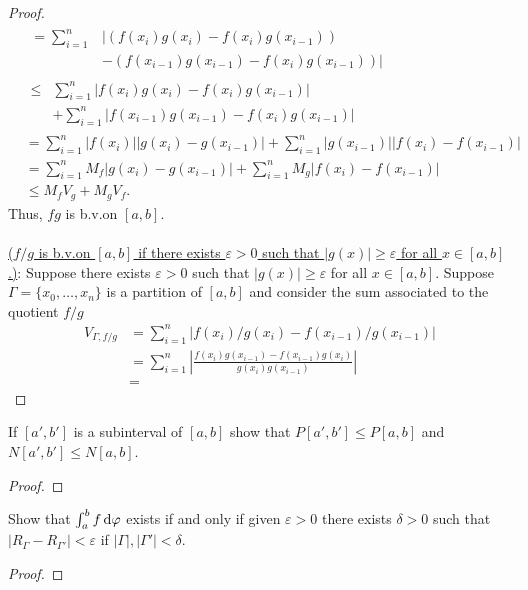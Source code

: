 \begin{proof}
\begin{equation}
\begin{aligned}
      &\begin{aligned}
        =\sum_{i=1}^n
        &\left|(f(x_i)g(x_i)-f(x_i)g(x_{i-1}))\right.\\
        &\left.-(f(x_{i-1})g(x_{i-1})-f(x_i)g(x_{i-1}))\right|
      \end{aligned}\\
      &\begin{aligned}
        \leq&\sum_{i=1}^n|f(x_i)g(x_i)-f(x_i)g(x_{i-1})|\\
        &+\sum_{i=1}^n|f(x_{i-1})g(x_{i-1})-f(x_i)g(x_{i-1})|
      \end{aligned}\\
      &=\sum_{i=1}^n|f(x_i)||g(x_i)-g(x_{i-1})|+\sum_{i=1}^n|g(x_{i-1})||f(x_i)-f(x_{i-1})|\\
      &=\sum_{i=1}^n
      M_f|g(x_i)-g(x_{i-1})|+\sum_{i=1}^nM_g|f(x_i)-f(x_{i-1})|\\
      &\leq M_fV_g+M_gV_f.
      \end{aligned}
    \end{equation}
    Thus, $fg$ is b.v.\@ on $[a,b]$.
    \\\\
    \underline{($f/g$ is b.v.\@ on $[a,b]$ if there exists $\varepsilon>0$
      such that $|g(x)|\geq\varepsilon$ for all $x\in[a,b]$.)}: Suppose
    there exists $\varepsilon>0$ such that $|g(x)|\geq\varepsilon$ for all
    $x\in[a,b]$. Suppose $\Gamma=\{x_0,\dotsc,x_n\}$ is a partition of
    $[a,b]$ and consider the sum associated to the quotient $f/g$
    \begin{equation}
      \label{eq:1:7}
      \begin{aligned}
        V_{\Gamma,f/g}
        &=\sum_{i=1}^n |f(x_i)/g(x_i)-f(x_{i-1})/g(x_{i-1})|\\
        &=\sum_{i=1}^n\left|\frac{f(x_i)g(x_{i-1})-
            f(x_{i-1})g(x_i)}{g(x_i)g(x_{i-1})}\right|\\
        &=
      \end{aligned}
    \end{equation}
\end{proof}

\begin{problem}
If $[a',b']$ is a subinterval of $[a,b]$ show that $P[a',b']\leq P[a,b]$
and $N[a',b']\leq N[a,b]$.
\end{problem}
\begin{proof}
\end{proof}
\begin{problem}
Show that $\int_a^bf\mathop{}\!\mathrm{d}\varphi$ exists if and only if given $\varepsilon>0$
there exists $\delta>0$ such that
$\left|R_\Gamma-R_{\Gamma'}\right|<\varepsilon$ if
$|\Gamma|,|\Gamma'|<\delta$.
\end{problem}
\begin{proof}
\end{proof}

